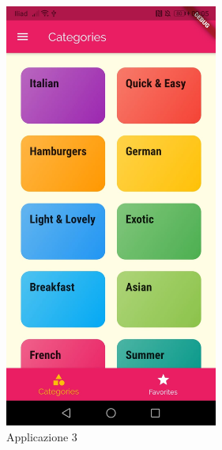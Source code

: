 \begin{figure}[htbp]	
	\centering
	\includegraphics[width=7cm]{immagini/app3.jpeg}
	\caption{Applicazione 3}
	\label{fig:Applicazione 3}
\end{figure}






